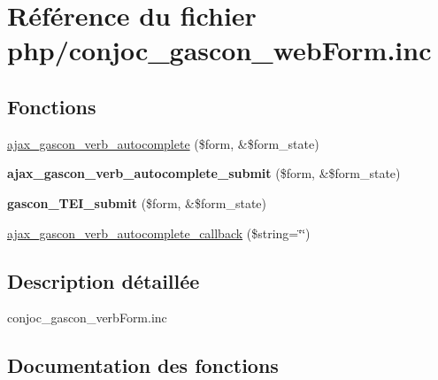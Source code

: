 \hypertarget{php_2conjoc__gascon__webForm_8inc}{}\section{Référence du fichier php/conjoc\+\_\+gascon\+\_\+web\+Form.inc}
\label{php_2conjoc__gascon__webForm_8inc}
\subsection*{Fonctions}
\begin{DoxyCompactItemize}
\item 
\hyperlink{php_2conjoc__gascon__webForm_8inc_a28516e435edf21d85ed77091d71f5d6b}{ajax\+\_\+gascon\+\_\+verb\+\_\+autocomplete} (\$form, \&\$form\+\_\+state)
\item 
\hypertarget{php_2conjoc__gascon__webForm_8inc_a332dbb7ab0a2190165164326af8cc7f1}{}\label{php_2conjoc__gascon__webForm_8inc_a332dbb7ab0a2190165164326af8cc7f1} 
{\bfseries ajax\+\_\+gascon\+\_\+verb\+\_\+autocomplete\+\_\+submit} (\$form, \&\$form\+\_\+state)
\item 
\hypertarget{php_2conjoc__gascon__webForm_8inc_aeae9bd30b3fa7e4a9edf10587db73c23}{}\label{php_2conjoc__gascon__webForm_8inc_aeae9bd30b3fa7e4a9edf10587db73c23} 
{\bfseries gascon\+\_\+\+T\+E\+I\+\_\+submit} (\$form, \&\$form\+\_\+state)
\item 
\hyperlink{php_2conjoc__gascon__webForm_8inc_a1be8e9edb4dcdb19c5b5bb88b48c5980}{ajax\+\_\+gascon\+\_\+verb\+\_\+autocomplete\+\_\+callback} (\$string=\char`\"{}\char`\"{})
\end{DoxyCompactItemize}


\subsection{Description détaillée}
conjoc\+\_\+gascon\+\_\+verb\+Form.\+inc 

\subsection{Documentation des fonctions}
\hypertarget{php_2conjoc__gascon__webForm_8inc_a28516e435edf21d85ed77091d71f5d6b}{}\label{php_2conjoc__gascon__webForm_8inc_a28516e435edf21d85ed77091d71f5d6b} 
